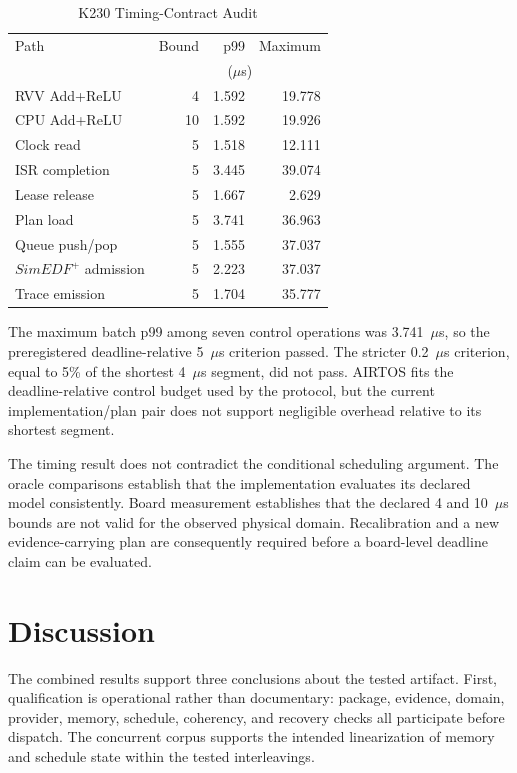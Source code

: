 \documentclass[lettersize,journal]{IEEEtran}
\begin{document}
\begin{table}[t]
\caption{K230 Timing-Contract Audit}
\label{tab:timing}
\centering
\footnotesize
\begin{tabular}{@{}lrrr@{}}
\toprule
Path & Bound & p99 & Maximum \\
 & \multicolumn{3}{c}{($\mu$s)} \\
\midrule
RVV Add+ReLU & 4 & 1.592 & 19.778 \\
CPU Add+ReLU & 10 & 1.592 & 19.926 \\
Clock read & 5 & 1.518 & 12.111 \\
ISR completion & 5 & 3.445 & 39.074 \\
Lease release & 5 & 1.667 & 2.629 \\
Plan load & 5 & 3.741 & 36.963 \\
Queue push/pop & 5 & 1.555 & 37.037 \\
$SimEDF^+$ admission & 5 & 2.223 & 37.037 \\
Trace emission & 5 & 1.704 & 35.777 \\
\bottomrule
\end{tabular}
\end{table}

The maximum batch p99 among seven control operations was 3.741~$\mu$s, so the
preregistered deadline-relative 5~$\mu$s criterion passed. The stricter
0.2~$\mu$s criterion, equal to 5\% of the shortest 4~$\mu$s segment, did not
pass. AIRTOS fits the deadline-relative control budget used by the protocol,
but the current implementation/plan pair does not support negligible overhead
relative to its shortest segment.

The timing result does not contradict the conditional scheduling argument.
The oracle comparisons establish that the implementation evaluates its
declared model consistently. Board measurement establishes that the declared
4 and 10~$\mu$s bounds are not valid for the observed physical domain.
Recalibration and a new evidence-carrying plan are consequently required before
a board-level deadline claim can be evaluated.

\section{Discussion}
The combined results support three conclusions about the tested artifact.
First, qualification is operational rather than documentary: package,
evidence, domain, provider, memory, schedule, coherency, and recovery checks all
participate before dispatch. The concurrent corpus supports the intended
linearization of memory and schedule state within the tested interleavings.
\end{document}
